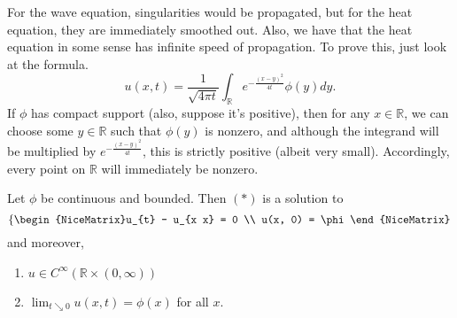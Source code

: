 			\begin{remark}
				For the wave equation, singularities would be propagated, but for the heat equation, they are immediately smoothed out. Also, we have that the heat equation in some sense has infinite speed of propagation. To prove this, just look at the formula.
				\[ u(x, t) = \frac{1}{\sqrt{4 \pi t}} \int_{\mathbb{R}} e^{- \frac{(x - y)^{2}}{4t}} \phi(y) dy. \]
				If \( \phi \) has compact support (also, suppose it's positive), then for any \( x \in \mathbb{R} \), we can choose some \( y \in \mathbb{R} \) such that \( \phi(y) \) is nonzero, and although the integrand will be multiplied by \( e^{- \frac{(x-y)^{2}}{4t}} \), this is strictly positive (albeit very small). Accordingly, every point on \( \mathbb{R} \) will immediately be nonzero.
			\end{remark}
\begin{theorem}
	Let \( \phi \) be continuous and bounded. Then \( (*) \) is a solution to 
	\[ \left\{\begin{NiceMatrix}u_{t} - u_{x x} = 0 \\ u(x, 0) = \phi\end{NiceMatrix}\right. \]
	and moreover, 
	\begin{enumerate}
	
		\item \( u \in C^{\infty}(\mathbb{R} \times (0, \infty)) \)
		\item \( \lim_{t \searrow 0} u(x, t) = \phi(x) \) for all \( x \).
	
	\end{enumerate}
\end{theorem}
